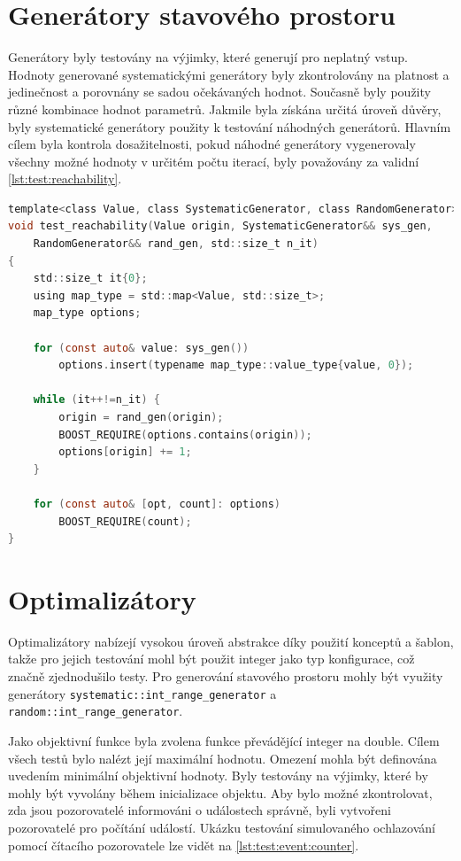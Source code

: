 \section{Generátory stavového prostoru}
Generátory byly testovány na výjimky, které generují pro neplatný vstup.
Hodnoty generované systematickými generátory byly zkontrolovány na platnost a jedinečnost a porovnány se sadou očekávaných hodnot.
Současně byly použity různé kombinace hodnot parametrů.
Jakmile byla získána určitá úroveň důvěry, byly systematické generátory použity k testování náhodných generátorů.
Hlavním cílem byla kontrola dosažitelnosti, pokud náhodné generátory vygenerovaly všechny možné hodnoty v určitém počtu iterací, byly považovány za validní \ref{lst:test:reachability}.

\begin{lstlisting}[caption={~Testování dosažitelnosti stavů},label={lst:test:reachability},captionpos=t,abovecaptionskip=-\medskipamount,belowcaptionskip=\medskipamount,language=C]
template<class Value, class SystematicGenerator, class RandomGenerator>
void test_reachability(Value origin, SystematicGenerator&& sys_gen,
    RandomGenerator&& rand_gen, std::size_t n_it)
{
    std::size_t it{0};
    using map_type = std::map<Value, std::size_t>;
    map_type options;

    for (const auto& value: sys_gen())
        options.insert(typename map_type::value_type{value, 0});

    while (it++!=n_it) {
        origin = rand_gen(origin);
        BOOST_REQUIRE(options.contains(origin));
        options[origin] += 1;
    }

    for (const auto& [opt, count]: options)
        BOOST_REQUIRE(count);
}
\end{lstlisting}

\section{Optimalizátory}
Optimalizátory nabízejí vysokou úroveň abstrakce díky použití konceptů a šablon, takže pro jejich testování mohl být použit integer jako typ konfigurace, což značně zjednodušilo testy.
Pro generování stavového prostoru mohly být využity generátory  \texttt{systematic::int\_range\_generator} a \texttt{random::int\_range\_generator}.

Jako objektivní funkce byla zvolena funkce převádějící integer na double.
Cílem všech testů bylo nalézt její maximální hodnotu.
Omezení mohla být definována uvedením minimální objektivní hodnoty.
Byly testovány na výjimky, které by mohly být vyvolány během inicializace objektu.
Aby bylo možné zkontrolovat, zda jsou pozorovatelé informováni o událostech správně, byli vytvořeni pozorovatelé pro počítání událostí.
Ukázku testování simulovaného ochlazování pomocí čítacího pozorovatele lze vidět na \ref{lst:test:event:counter}.

